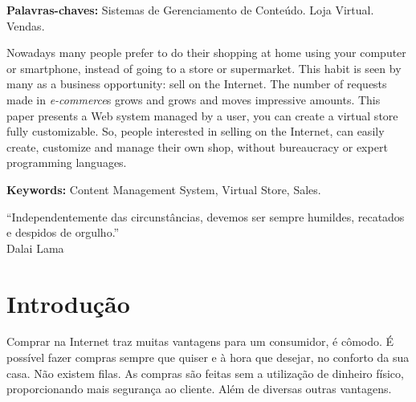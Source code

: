 \documentclass[a4paper,12pt]{monografia}
\renewcommand{\tablename}{Quadro}
\begin{document}
\noindent \textbf{Palavras-chaves:} Sistemas de Gerenciamento de Conteúdo. Loja Virtual. Vendas.

Nowadays many people prefer to do their shopping at home using your computer or smartphone, instead of going to a store or supermarket. This habit is seen by many as a business opportunity: sell on the Internet. The number of requests made in \textit{e-commerce}s grows and grows and moves impressive amounts. This paper presents a Web system managed by a user, you can create a virtual store fully customizable. So, people interested in selling on the Internet, can easily create, customize and manage their own shop, without bureaucracy or expert programming languages.

\noindent \textbf{Keywords:} Content Management System, Virtual Store, Sales.


\begin{epigrafe}
“Independentemente das circunstâncias, devemos ser sempre humildes, recatados e despidos de orgulho.”\\
\hfill Dalai Lama
\end{epigrafe}



{%
\let\oldnumberline\numberline%
\renewcommand{\numberline}{\figurename~\oldnumberline}%
\listoffigures%
\thispagestyle{empty}
}

\renewcommand\listtablename{Lista de Quadros}

{%
\let\oldnumberline\numberline%
\renewcommand{\numberline}{\tablename~\oldnumberline}%
\listoftables%
\thispagestyle{empty}
}

\tableofcontents
% 
\chapter{Introdução} %
\label{cha:intro}
\setcounter{page}{1}

Comprar na Internet traz muitas vantagens para um consumidor, é cômodo. É possível fazer compras sempre que quiser e à hora que desejar, no conforto da sua casa. Não existem filas. As compras são feitas sem a utilização de dinheiro físico, proporcionando mais segurança ao cliente.  Além de diversas outras vantagens.
\end{document}
